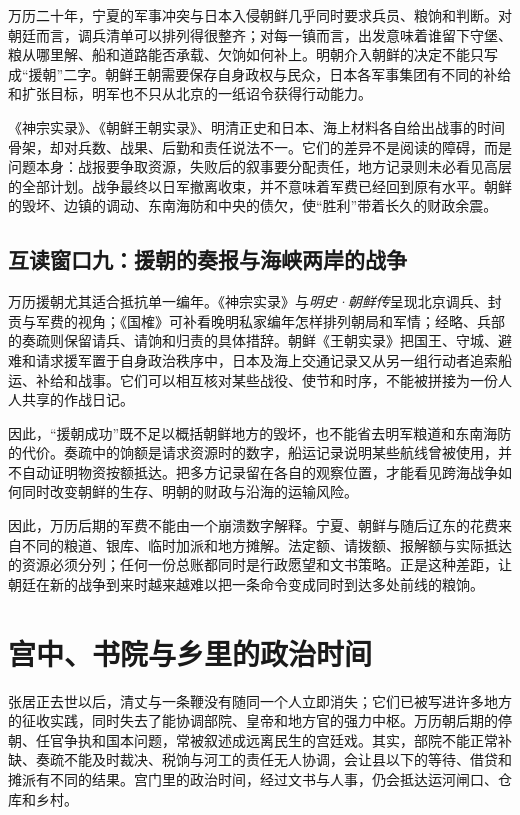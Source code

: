 万历二十年，宁夏的军事冲突与日本入侵朝鲜几乎同时要求兵员、粮饷和判断。对朝廷而言，调兵清单可以排列得很整齐；对每一镇而言，出发意味着谁留下守堡、粮从哪里解、船和道路能否承载、欠饷如何补上。明朝介入朝鲜的决定不能只写成“援朝”二字。朝鲜王朝需要保存自身政权与民众，日本各军事集团有不同的补给和扩张目标，明军也不只从北京的一纸诏令获得行动能力。

《神宗实录》、《朝鲜王朝实录》、明清正史和日本、海上材料各自给出战事的时间骨架，却对兵数、战果、后勤和责任说法不一。它们的差异不是阅读的障碍，而是问题本身：战报要争取资源，失败后的叙事要分配责任，地方记录则未必看见高层的全部计划。战争最终以日军撤离收束，并不意味着军费已经回到原有水平。朝鲜的毁坏、边镇的调动、东南海防和中央的债欠，使“胜利”带着长久的财政余震。

\subsection{互读窗口九：援朝的奏报与海峡两岸的战争}

万历援朝尤其适合抵抗单一编年。《神宗实录》与\textit{明史·朝鲜传}呈现北京调兵、封贡与军费的视角；《国榷》可补看晚明私家编年怎样排列朝局和军情；经略、兵部的奏疏则保留请兵、请饷和归责的具体措辞。朝鲜《王朝实录》把国王、守城、避难和请求援军置于自身政治秩序中，日本及海上交通记录又从另一组行动者追索船运、补给和战事。它们可以相互核对某些战役、使节和时序，不能被拼接为一份人人共享的作战日记。

因此，“援朝成功”既不足以概括朝鲜地方的毁坏，也不能省去明军粮道和东南海防的代价。奏疏中的饷额是请求资源时的数字，船运记录说明某些航线曾被使用，并不自动证明物资按额抵达。把多方记录留在各自的观察位置，才能看见跨海战争如何同时改变朝鲜的生存、明朝的财政与沿海的运输风险。

因此，万历后期的军费不能由一个崩溃数字解释。宁夏、朝鲜与随后辽东的花费来自不同的粮道、银库、临时加派和地方摊解。法定额、请拨额、报解额与实际抵达的资源必须分列；任何一份总账都同时是行政愿望和文书策略。正是这种差距，让朝廷在新的战争到来时越来越难以把一条命令变成同时到达多处前线的粮饷。

\section{宫中、书院与乡里的政治时间}
\label{sec:wanli-court-local}

张居正去世以后，清丈与一条鞭没有随同一个人立即消失；它们已被写进许多地方的征收实践，同时失去了能协调部院、皇帝和地方官的强力中枢。万历朝后期的停朝、任官争执和国本问题，常被叙述成远离民生的宫廷戏。其实，部院不能正常补缺、奏疏不能及时裁决、税饷与河工的责任无人协调，会让县以下的等待、借贷和摊派有不同的结果。宫门里的政治时间，经过文书与人事，仍会抵达运河闸口、仓库和乡村。

